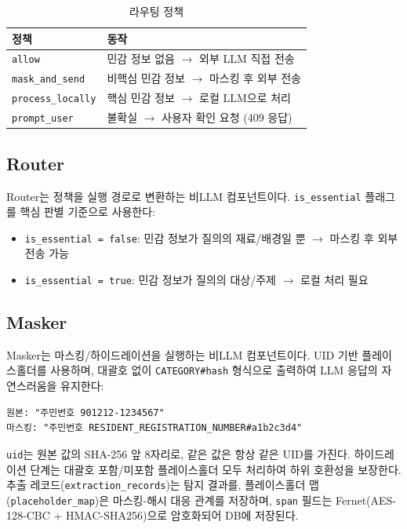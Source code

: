 \documentclass[11pt,a4paper]{article}
\begin{document}
\begin{table}[h]
\centering
\begin{tabular}{@{}ll@{}}
\toprule
정책 & 동작 \\
\midrule
\texttt{allow} & 민감 정보 없음 $\rightarrow$ 외부 LLM 직접 전송 \\
\texttt{mask\_and\_send} & 비핵심 민감 정보 $\rightarrow$ 마스킹 후 외부 전송 \\
\texttt{process\_locally} & 핵심 민감 정보 $\rightarrow$ 로컬 LLM으로 처리 \\
\texttt{prompt\_user} & 불확실 $\rightarrow$ 사용자 확인 요청 (409 응답) \\
\bottomrule
\end{tabular}
\caption{라우팅 정책}
\end{table}

\subsection{Router}

Router는 정책을 실행 경로로 변환하는 비LLM 컴포넌트이다. \texttt{is\_essential} 플래그를 핵심 판별 기준으로 사용한다:

\begin{itemize}[nosep]
  \item \texttt{is\_essential = false}: 민감 정보가 질의의 재료/배경일 뿐 $\rightarrow$ 마스킹 후 외부 전송 가능
  \item \texttt{is\_essential = true}: 민감 정보가 질의의 대상/주제 $\rightarrow$ 로컬 처리 필요
\end{itemize}

\subsection{Masker}

Masker는 마스킹/하이드레이션을 실행하는 비LLM 컴포넌트이다. UID 기반 플레이스홀더를 사용하며, 대괄호 없이 \texttt{CATEGORY\#hash} 형식으로 출력하여 LLM 응답의 자연스러움을 유지한다:

\begin{verbatim}
원본: "주민번호 901212-1234567"
마스킹: "주민번호 RESIDENT_REGISTRATION_NUMBER#a1b2c3d4"
\end{verbatim}

\texttt{uid}는 원본 값의 SHA-256 앞 8자리로, 같은 값은 항상 같은 UID를 가진다. 하이드레이션 단계는 대괄호 포함/미포함 플레이스홀더 모두 처리하여 하위 호환성을 보장한다. 추출 레코드(\texttt{extraction\_records})는 탐지 결과를, 플레이스홀더 맵(\texttt{placeholder\_map})은 마스킹-해시 대응 관계를 저장하며, \texttt{span} 필드는 Fernet(AES-128-CBC + HMAC-SHA256)으로 암호화되어 DB에 저장된다.
\end{document}
